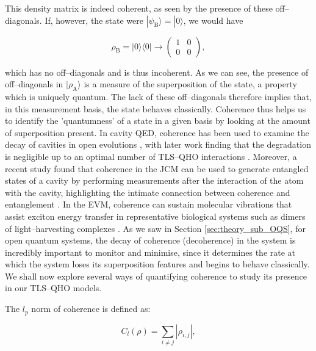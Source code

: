\documentclass[11pt]{article}
\newcounter{subsubsubsection}[subsubsection]
\begin{document}
This density matrix is indeed coherent, as seen by the presence of these off--diagonals. If, however, the state were $|\psi_{\scriptscriptstyle \text{B}}\rangle = |0\rangle$, we would have

\begin{equation*}
    \rho_{\scriptscriptstyle \text{B}} = |0\rangle\langle0| \rightarrow 
    \begin{pmatrix}
        1 & 0 \\
        0 & 0
    \end{pmatrix},
\end{equation*}

which has no off--diagonals and is thus incoherent. As we can see, the presence of off--diagonals in $|\rho_{\scriptscriptstyle \text{A}} \rangle$ is a measure of the superposition of the state, a property which is uniquely quantum. The lack of these off--diagonals therefore implies that, in this measurement basis, the state behaves classically. Coherence thus helps us to identify the 'quantumness' of a state in a given basis by looking at the amount of superposition present. In cavity QED, coherence has been used to examine the decay of cavities in open evolutions \cite{QResJCm2004-cQED_coherence}, with later work finding that the degradation is negligible up to an optimal number of TLS--QHO interactions \cite{CohEnt2020-Cavity_controlled_coherence}. Moreover, a recent study found that coherence in the JCM can be used to generate entangled states of a cavity by performing measurements after the interaction of the atom with the cavity, highlighting the intimate connection between coherence and entanglement \cite{CohEnt2024-2_JCM_coherence}. In the EVM, coherence can  sustain molecular vibrations that assist exciton energy transfer in representative biological systems such as dimers of light--harvesting complexes \cite{ExVib2014-Alexandra}. As we saw in Section \ref{sec:theory_sub_OQS}, for open quantum systems, the decay of coherence (decoherence) in the system is incredibly important to monitor and minimise,  since it determines the rate at which the system loses its superposition features and begins to behave classically. We shall now explore several ways of quantifying coherence to study its presence in our TLS--QHO models. 


The $l_p$ norm of coherence is defined as:

\begin{equation}
    C_l(\rho) = \sum_{i\neq j} |\rho_{i,j}|, 
\end{equation}
\end{document}
